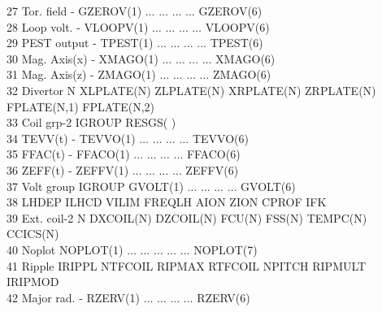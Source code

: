 \begin{tabbing}
\tiny 27 \> \tiny Tor. field \> \tiny  - \>\tiny GZEROV(1)  \> $\ldots$ \>
$\ldots$ \> $\ldots$ \> $\ldots$ \>\tiny GZEROV(6)\\
\tiny 28 \> \tiny Loop volt. \> \tiny  - \>\tiny VLOOPV(1)  \> $\ldots$ \>
$\ldots$ \> $\ldots$ \> $\ldots$ \>\tiny VLOOPV(6)\\
\tiny 29 \>  \tiny PEST output\> \tiny  - \>\tiny TPEST(1)  \> $\ldots$ \>
$\ldots$ \> $\ldots$ \> $\ldots$ \>\tiny TPEST(6)\\
\tiny 30 \>\tiny Mag. Axis(x) \> \tiny  - \>\tiny XMAGO(1) \> $\ldots$ \>
$\ldots$ \> $\ldots$ \> $\ldots$ \>\tiny XMAGO(6)\\
\tiny 31 \> \tiny Mag. Axis(z) \> \tiny  - \>\tiny ZMAGO(1) \> $\ldots$ \>
$\ldots$ \> $\ldots$ \> $\ldots$ \>\tiny ZMAGO(6)\\
\tiny 32 \> \tiny Divertor \> \tiny N \>\tiny XLPLATE(N) \>\tiny
ZLPLATE(N) \>\tiny XRPLATE(N) \>\tiny ZRPLATE(N) \>\tiny FPLATE(N,1)
\>\tiny FPLATE(N,2)\\
\tiny 33 \> \tiny Coil grp-2 \>\tiny IGROUP \>\tiny RESGS( )\\
\tiny 34 \> \tiny TEVV(t) \> \tiny  -  \>\tiny TEVVO(1)  \> $\ldots$ \>
$\ldots$ \> $\ldots$ \> $\ldots$ \>\tiny TEVVO(6)\\
\tiny 35 \> \tiny FFAC(t) \> \tiny  -  \>\tiny FFACO(1)  \> $\ldots$ \>
$\ldots$ \> $\ldots$ \> $\ldots$ \>\tiny FFACO(6)\\
\tiny 36 \> \tiny ZEFF(t) \> \tiny  -  \>\tiny ZEFFV(1)  \> $\ldots$ \>
$\ldots$ \> $\ldots$ \> $\ldots$ \>\tiny ZEFFV(6)\\
\tiny 37 \> \tiny Volt group \> \tiny  IGROUP \>\tiny GVOLT(1) \>$\ldots$
\>$\ldots$ \>$\ldots$ \>$\ldots$ \>\tiny GVOLT(6)\\
\tiny 38 \> \tiny LHDEP \> \tiny  ILHCD \>\tiny VILIM  \>\tiny
FREQLH \>\tiny AION \>\tiny ZION \>\tiny CPROF \>\tiny IFK\\
\tiny 39 \> \tiny Ext. coil-2 \> \tiny  N \>\tiny DXCOIL(N)  \>\tiny
DZCOIL(N) \>\tiny FCU(N) \>\tiny FSS(N) \>\tiny TEMPC(N) \>\tiny CCICS(N) \\
\tiny 40 \> \tiny Noplot \> \tiny NOPLOT(1) \>$\ldots$ \>$\ldots$ \>$\ldots$
\>$\ldots$ \>$\ldots$ \>\tiny NOPLOT(7)\\
\tiny 41 \> \tiny Ripple \> \tiny  IRIPPL \>\tiny NTFCOIL \>\tiny
RIPMAX \>\tiny RTFCOIL \>\tiny NPITCH \>\tiny RIPMULT \>\tiny
IRIPMOD\\
\tiny 42 \> \tiny Major rad. \> \tiny - \>\tiny  RZERV(1) \>$\ldots$
\>$\ldots$ \>$\ldots$ \>$\ldots$ \>\tiny RZERV(6) \\

\end{tabbing}
